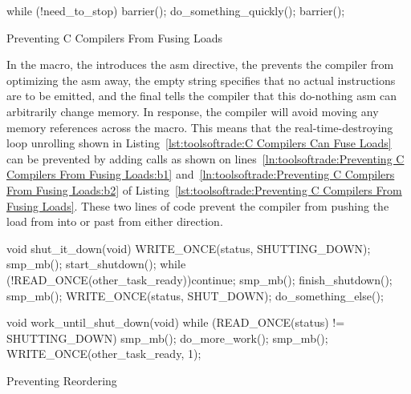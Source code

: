 \begin{listing}[tbp]
\begin{linelabel}
\begin{VerbatimL}[commandchars=\\\[\]]
while (!need_to_stop) {
	barrier(); \lnlbl[b1]
	do_something_quickly();
	barrier(); \lnlbl[b2]
}
\end{VerbatimL}
\end{linelabel}
\caption{Preventing C Compilers From Fusing Loads}
\label{lst:toolsoftrade:Preventing C Compilers From Fusing Loads}
\end{listing}

In the  macro, the  introduces the asm
directive, the  prevents the compiler from optimizing
the asm away, the empty string specifies that no actual instructions
are to be emitted, and the final  tells the compiler that
this do-nothing asm can arbitrarily change memory.
In response, the compiler will avoid moving any memory references across
the  macro.
This means that the real-time-destroying loop unrolling shown in
Listing~\ref{lst:toolsoftrade:C Compilers Can Fuse Loads}
can be prevented by adding  calls as shown on
lines~\ref{ln:toolsoftrade:Preventing C Compilers From Fusing Loads:b1}
and~\ref{ln:toolsoftrade:Preventing C Compilers From Fusing Loads:b2}
of
Listing~\ref{lst:toolsoftrade:Preventing C Compilers From Fusing Loads}.
These two lines of code prevent the compiler from pushing the load from
 into or past  from either
direction.

\begin{listing}[tbp]
\begin{linelabel}
\begin{VerbatimL}[commandchars=\\\[\]]
void shut_it_down(void)
{
	WRITE_ONCE(status, SHUTTING_DOWN);
	smp_mb(); \lnlbl[mb1]
	start_shutdown();
	while (!READ_ONCE(other_task_ready))\lnlbl[loop:b]
		continue;
	smp_mb(); \lnlbl[mb2]
	finish_shutdown();
	smp_mb(); \lnlbl[mb3]
	WRITE_ONCE(status, SHUT_DOWN);
	do_something_else();
}

void work_until_shut_down(void)
{
	while (READ_ONCE(status) != SHUTTING_DOWN) {
		smp_mb(); \lnlbl[mb4]
		do_more_work();
	}
	smp_mb(); \lnlbl[mb5]
	WRITE_ONCE(other_task_ready, 1);
}
\end{VerbatimL}
\end{linelabel}
\caption{Preventing Reordering}
\label{lst:toolsoftrade:Preventing Reordering}
\end{listing}

